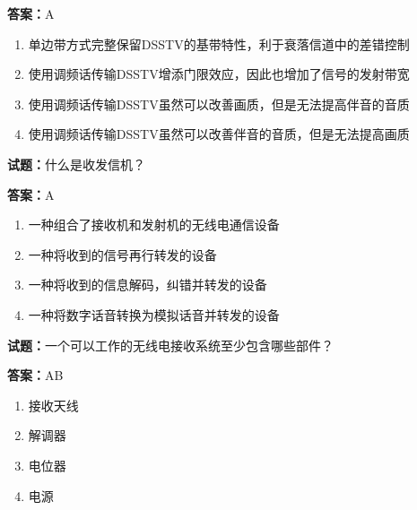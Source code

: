 \documentclass{ctexbook}
\begin{document}
\textbf{答案：}A 

\begin{enumerate}[leftmargin=3em]
  \item 单边带方式完整保留DSSTV的基带特性，利于衰落信道中的差错控制 

  \item 使用调频话传输DSSTV增添门限效应，因此也增加了信号的发射带宽 

  \item 使用调频话传输DSSTV虽然可以改善画质，但是无法提高伴音的音质 

  \item 使用调频话传输DSSTV虽然可以改善伴音的音质，但是无法提高画质 

\end{enumerate}





\vspace{1em}

\textbf{试题：}什么是收发信机？ 

\textbf{答案：}A 

\begin{enumerate}[leftmargin=3em]
  \item 一种组合了接收机和发射机的无线电通信设备 

  \item 一种将收到的信号再行转发的设备 

  \item 一种将收到的信息解码，纠错并转发的设备 

  \item 一种将数字话音转换为模拟话音并转发的设备 

\end{enumerate}





\vspace{1em}

\textbf{试题：}一个可以工作的无线电接收系统至少包含哪些部件？ 

\textbf{答案：}AB 

\begin{enumerate}[leftmargin=3em]
  \item 接收天线 

  \item 解调器 

  \item 电位器 

  \item 电源 

\end{enumerate}
\end{document}
